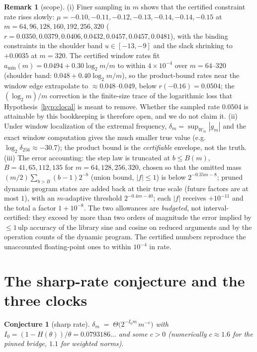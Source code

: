 \documentclass[11pt]{article}
\newtheorem{conjecture}[theorem]{Conjecture}
\theoremstyle{definition}
\newtheorem{remark}[theorem]{Remark}
\begin{document}
\begin{remark}[scope]\label{rem:instscope}
(i) Finer sampling in $m$ shows that the certified constraint rate rises
slowly: $\mu=-0.10,-0.11,-0.12,-0.13,-0.14,-0.14,-0.15$ at
$m=64,96,128,160,192,256,320$
($r=0.0350,0.0379,0.0406,0.0432,0.0457,0.0457,0.0481$), with the binding
constraints in the shoulder band $u\in[-13,-9]$ and the slack shrinking to
$+0.0035$ at $m=320$. The certified window rates fit
$a_{\min}(m)=0.0494+0.30\log_2 m/m$ to within $4\times 10^{-4}$ over
$m=64$--$320$ (shoulder band: $0.048+0.40\log_2 m/m$), so the
product-bound rates near the window edge extrapolate to
$\approx 0.048$--$0.049$, below $r(-0.16)=0.0504$; the
$(\log_2 m)/m$ correction is the finite-size trace of the logarithmic loss
that Hypothesis~\ref{hyp:clocal} is meant to remove. Whether the sampled
rate $0.0504$ is attainable by this bookkeeping is therefore open, and we
do not claim it. (ii) Under window localization
of the extremal frequency, $\delta_m=\sup_{W_m}|g_m|$ and the exact window
computation gives the much smaller true value
(e.g.\ $\log_2\delta_{256}\approx-30.7$); the product bound is the
\emph{certifiable} envelope, not the truth. (iii) The error accounting:
the step law is truncated at $b\le B(m)$, $B=41,65,112,135$ for
$m=64,128,256,320$, chosen so that the omitted mass
$(m/2)\sum_{b>B}(b-1)2^{-b}$ (union bound, $|f|\le 1$) is below
$2^{-0.35m-8}$; pruned dynamic program states are added back at their true
scale (future factors are at most $1$), with an $m$-adaptive threshold
$2^{-0.4m-40}$; each $|f|$ receives $+10^{-11}$ and the total a factor
$1+10^{-8}$. The two allowances are \emph{budgeted}, not
interval-certified: they exceed by more than two orders of magnitude the
error implied by $\le 1$\,ulp accuracy of the library sine and cosine on
reduced arguments and by the operation counts of the dynamic program. The
certified numbers reproduce the unaccounted floating-point ones to within
$10^{-4}$ in rate.
\end{remark}

\section{The sharp-rate conjecture and the three clocks}\label{sec:conj}

\begin{conjecture}[sharp rate]\label{conj:c1}
$\delta_m\;=\;\Theta\bigl(2^{-I_0 m}\,m^{-c}\bigr)$ with
$I_0=(1-H(\theta))/\theta=0.0793186\ldots$ and some $c>0$
(numerically $c\approx 1.6$ for the pinned bridge, $1.1$ for weighted
norms).
\end{conjecture}
\end{document}
